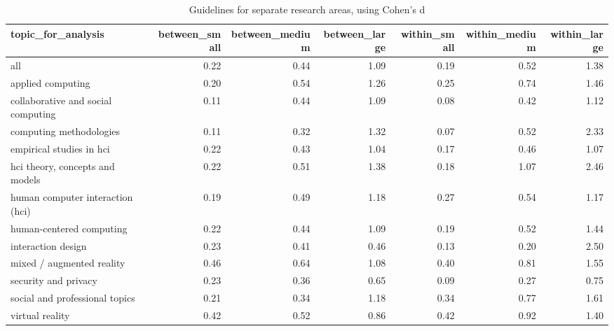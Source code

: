 \begin{table}[ht]
\centering
\begin{tabular}{lrrrrrr}
  \hline
topic\_for\_analysis & between\_small & between\_medium & between\_large & within\_small & within\_medium & within\_large \\ 
  \hline
all & 0.22 & 0.44 & 1.09 & 0.19 & 0.52 & 1.38 \\ 
  applied computing & 0.20 & 0.54 & 1.26 & 0.25 & 0.74 & 1.46 \\ 
  collaborative and social computing & 0.11 & 0.44 & 1.09 & 0.08 & 0.42 & 1.12 \\ 
  computing methodologies & 0.11 & 0.32 & 1.32 & 0.07 & 0.52 & 2.33 \\ 
  empirical studies in hci & 0.22 & 0.43 & 1.04 & 0.17 & 0.46 & 1.07 \\ 
  hci theory, concepts and models & 0.22 & 0.51 & 1.38 & 0.18 & 1.07 & 2.46 \\ 
  human computer interaction (hci) & 0.19 & 0.49 & 1.18 & 0.27 & 0.54 & 1.17 \\ 
  human-centered computing & 0.22 & 0.44 & 1.09 & 0.19 & 0.52 & 1.44 \\ 
  interaction design & 0.23 & 0.41 & 0.46 & 0.13 & 0.20 & 2.50 \\ 
  mixed / augmented reality & 0.46 & 0.64 & 1.08 & 0.40 & 0.81 & 1.55 \\ 
  security and privacy & 0.23 & 0.36 & 0.65 & 0.09 & 0.27 & 0.75 \\ 
  social and professional topics & 0.21 & 0.34 & 1.18 & 0.34 & 0.77 & 1.61 \\ 
  virtual reality & 0.42 & 0.52 & 0.86 & 0.42 & 0.92 & 1.40 \\ 
   \hline
\end{tabular}
\caption{Guidelines for separate research areas, using Cohen's d} 
\label{tab:es guidelines cohensd-es different topics}
\end{table}

